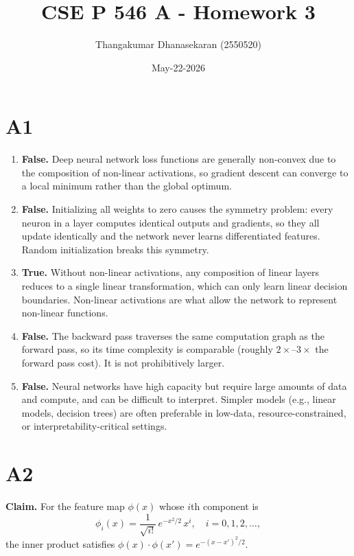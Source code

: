 \documentclass{article}
\title{CSE P 546 A - Homework 3}
\author{Thangakumar Dhanasekaran (2550520)}
\date{May-22-2026}
\begin{document}
\maketitle

\section*{A1}

\begin{enumerate}
  \item[(a)] \textbf{False.} Deep neural network loss functions are generally non-convex due to the composition of non-linear activations, so gradient descent can converge to a local minimum rather than the global optimum.

  \item[(b)] \textbf{False.} Initializing all weights to zero causes the symmetry problem: every neuron in a layer computes identical outputs and gradients, so they all update identically and the network never learns differentiated features. Random initialization breaks this symmetry.

  \item[(c)] \textbf{True.} Without non-linear activations, any composition of linear layers reduces to a single linear transformation, which can only learn linear decision boundaries. Non-linear activations are what allow the network to represent non-linear functions.

  \item[(d)] \textbf{False.} The backward pass traverses the same computation graph as the forward pass, so its time complexity is comparable (roughly $2\times$--$3\times$ the forward pass cost). It is not prohibitively larger.

  \item[(e)] \textbf{False.} Neural networks have high capacity but require large amounts of data and compute, and can be difficult to interpret. Simpler models (e.g., linear models, decision trees) are often preferable in low-data, resource-constrained, or interpretability-critical settings.
\end{enumerate}

\section*{A2}

\textbf{Claim.} For the feature map $\phi(x)$ whose $i$th component is
\[
  \phi_i(x) = \frac{1}{\sqrt{i!}}\,e^{-x^2/2}\,x^i, \quad i = 0, 1, 2, \ldots,
\]
the inner product satisfies $\phi(x)\cdot\phi(x') = e^{-(x-x')^2/2}$.
\end{document}
